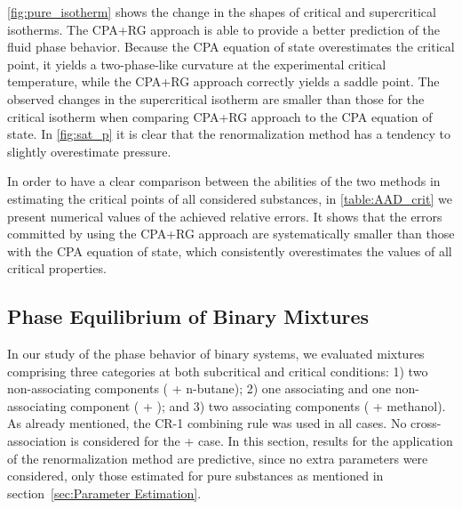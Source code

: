 \documentclass[preprint,12pt,3p]{elsarticle}
\begin{document}
\cref{fig:pure_isotherm} shows the change in the shapes of critical and supercritical isotherms.
The CPA+RG approach is able to provide a better prediction of the fluid phase behavior.
Because the CPA equation of state overestimates the critical point, it yields a two-phase-like curvature at the experimental critical temperature, while the CPA+RG approach correctly yields a saddle point.
The observed changes in the supercritical isotherm are smaller than those for the critical isotherm when comparing CPA+RG approach to the CPA equation of state.
In \cref{fig:sat_p} it is clear that the renormalization method has a tendency to slightly overestimate pressure.

In order to have a clear comparison between the abilities of the two methods in estimating the critical points of all considered substances, in \cref{table:AAD_crit} we present numerical values of the achieved relative errors.
It shows that the errors committed by using the CPA+RG approach are systematically smaller than those with the CPA equation of state, which consistently overestimates the values of all critical properties.

\subsection{Phase Equilibrium of Binary Mixtures}

In our study of the phase behavior of binary systems, we evaluated mixtures comprising three categories at both subcritical and critical conditions: 1) two non-associating components ( + n-butane); 2) one associating and one non-associating component ( + ); and 3) two associating components ( + methanol).
As already mentioned, the CR-1 combining rule was used in all cases.
No cross-association is considered for the  +  case. In this section, results for the application of the renormalization method are predictive, since no extra parameters were considered, only those estimated for pure substances as mentioned in section~\ref{sec:Parameter Estimation}.
\end{document}
